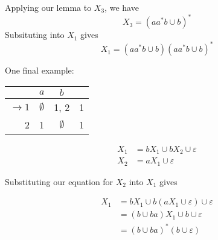 Applying our lemma to $X_3$, we have \[X_3=(aa^*b\cup b)^*\] Subsituting into $X_1$ gives \[X_1=(aa^*b\cup b)(aa^*b\cup b)^*\] 

One final example:

\begin{center}\begin{tabular}{r| c c r}
      & $a$ & $b$ & \\\hline
      $\to 1$ & $\emptyset$ & 1, 2 & 1\\
            2 & 1 & $\emptyset$ & 1\\
 \end{tabular}\end{center}

\begin{align*}
      X_1 &= bX_1\cup bX_2\cup\varepsilon\\
      X_2 &= aX_1\cup\varepsilon
\end{align*}

Substituting our equation for $X_2$ into $X_1$ gives 

\begin{align*}
      X_1&=bX_1\cup b(aX_1\cup\varepsilon)\cup\varepsilon\\
         &=(b\cup ba)X_1\cup b\cup\varepsilon\\
         &=(b\cup ba)^*(b\cup\varepsilon)
\end{align*}

